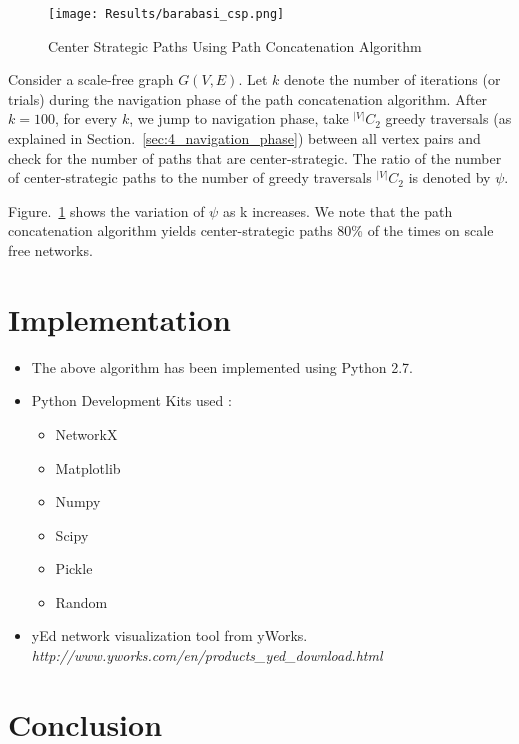\documentclass[a4paper,12pt]{article}
\begin{document}
\begin{figure}[htp!]
 
\begin{center}
\texttt{[image: Results/barabasi\_csp.png]}
\caption{Center Strategic Paths Using Path Concatenation Algorithm}
\label{4_mainplot}
\end{center}
\end{figure}

Consider a scale-free graph $G(V,E)$. Let $k$ denote the number of iterations 
(or trials) during the navigation phase of the path concatenation algorithm.
After $k=100$, for every $k$, we jump to navigation phase, take $^{|V|}C_2$ greedy 
traversals (as explained in Section.~\ref{sec:4_navigation_phase}) between all vertex pairs and check for 
the number of paths that are center-strategic. The ratio of the number of 
center-strategic paths to the number of greedy traversals $^{|V|}C_2$ is denoted 
by $\psi$.

Figure.~\ref{4_mainplot} shows the variation of $\psi$ as k increases. We note that the path 
concatenation algorithm yields center-strategic paths 80\% of the times on 
scale free networks.

\newpage
\section{Implementation}
\begin{itemize}
 \item The above algorithm has been implemented using Python 2.7. 
 \item Python Development Kits used :
 \begin{itemize}
  \item NetworkX
  \item Matplotlib
  \item Numpy
  \item Scipy
  \item Pickle  
  \item Random
 \end{itemize}
\item yEd network visualization tool from yWorks.
\\\emph{http://www.yworks.com/en/products\_yed\_download.html}
\end{itemize}

 

\section{Conclusion}
\label{sec:4_conclusion}
\end{document}
